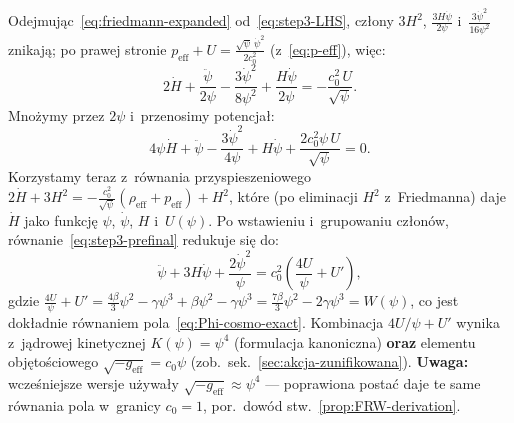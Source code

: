 \begin{remark}
\begin{equation}
\end{equation}
Odejmuj\k{a}c~\eqref{eq:friedmann-expanded}
od~\eqref{eq:step3-LHS}, cz\l{}ony $3H^2$,
$\frac{3H\dot\psi}{2\psi}$ i~$\frac{3\dot\psi^2}{16\psi^2}$
znikaj\k{a}; po prawej stronie
$p_{\mathrm{eff}} + U
= \frac{\sqrt\psi\,\dot\psi^2}{2c_0^2}$
(z~\eqref{eq:p-eff}), wi\k{e}c:
\begin{equation}\label{eq:step3-after-friedmann}
  2\dot H + \frac{\ddot\psi}{2\psi}
  - \frac{3\dot\psi^2}{8\psi^2}
  + \frac{H\dot\psi}{2\psi}
  = -\frac{c_0^2\,U}{\sqrt\psi}.
\end{equation}
Mno\.zymy przez $2\psi$ i~przenosimy potencja\l{}:
\begin{equation}\label{eq:step3-prefinal}
  4\psi\dot H + \ddot\psi
  - \frac{3\dot\psi^2}{4\psi}
  + H\dot\psi
  + \frac{2c_0^2\psi\,U}{\sqrt\psi} = 0.
\end{equation}
Korzystamy teraz z~r\'ownania przyspieszeniowego
$2\dot H + 3H^2 = -\frac{c_0^2}{\sqrt\psi}
(\rho_{\mathrm{eff}} + p_{\mathrm{eff}}) + H^2$,
kt\'ore (po eliminacji $H^2$ z~Friedmanna) daje
$\dot H$ jako funkcj\k{e} $\psi$, $\dot\psi$, $H$
i~$U(\psi)$. Po wstawieniu
i~grupowaniu cz\l{}on\'ow, r\'ownanie~\eqref{eq:step3-prefinal}
redukuje si\k{e} do:
\[
  \ddot\psi + 3H\dot\psi + \frac{2\dot\psi^2}{\psi}
  = c_0^2\!\left(\frac{4U}{\psi} + U'\right),
\]
gdzie
$\frac{4U}{\psi} + U'
= \frac{4\beta}{3}\psi^2 - \gamma\psi^3 + \beta\psi^2 - \gamma\psi^3
= \frac{7\beta}{3}\psi^2 - 2\gamma\psi^3 = W(\psi)$,
co jest dok\l{}adnie r\'ownaniem pola~\eqref{eq:Phi-cosmo-exact}.
Kombinacja $4U/\psi + U'$ wynika z~jądrowej kinetycznej
$K(\psi)=\psi^4$ (formulacja kanoniczna) \textbf{oraz}
elementu objętościowego $\sqrt{-g_{\mathrm{eff}}} = c_0\psi$
(zob.\ sek.~\ref{sec:akcja-zunifikowana}).
\textbf{Uwaga:} wcześniejsze wersje używały
$\sqrt{-g_{\mathrm{eff}}} \approx \psi^4$ ---
poprawiona postać daje te same r\'ownania pola
w~granicy $c_0 = 1$, por.\ dow\'od stw.~\ref{prop:FRW-derivation}.
\end{remark}

